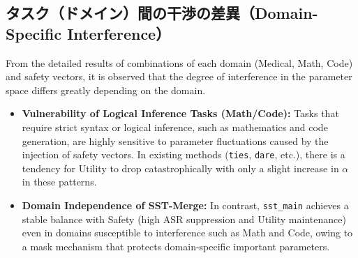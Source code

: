 \documentclass{article}
\begin{document}
\subsection{タスク（ドメイン）間の干渉の差異（Domain-Specific Interference）}

From the detailed results of combinations of each domain (Medical, Math, Code) and safety vectors, it is observed that the degree of interference in the parameter space differs greatly depending on the domain.
\begin{itemize}
    \item \textbf{Vulnerability of Logical Inference Tasks (Math/Code):} Tasks that require strict syntax or logical inference, such as mathematics and code generation, are highly sensitive to parameter fluctuations caused by the injection of safety vectors. In existing methods (\texttt{ties}, \texttt{dare}, etc.), there is a tendency for Utility to drop catastrophically with only a slight increase in $\alpha$ in these patterns.
    \item \textbf{Domain Independence of SST-Merge:} In contrast, \texttt{sst\_main} achieves a stable balance with Safety (high ASR suppression and Utility maintenance) even in domains susceptible to interference such as Math and Code, owing to a mask mechanism that protects domain-specific important parameters.
\end{itemize}
\end{document}
